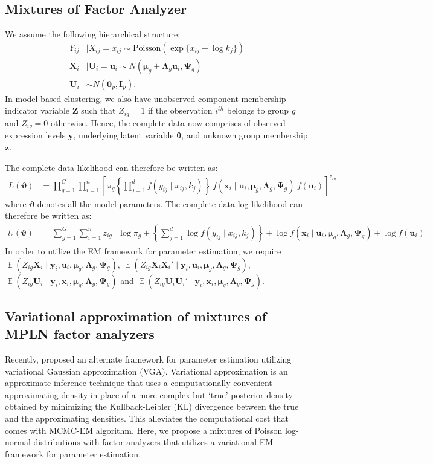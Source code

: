 \documentclass[12pt]{article}
\newcommand{\bI}{\mathbf{I}}
\newcommand{\bU}{\mathbf{U}}
\newcommand{\bX}{\mathbf{X}}
\newcommand{\bu}{\mathbf{u}}
\newcommand{\bx}{\mathbf{x}}
\newcommand{\by}{\mathbf{y}}
\newcommand{\btheta}{\boldsymbol{\theta}}
\newcommand{\bmu}{\boldsymbol{\mu}}
\newcommand{\bLambda}{\boldsymbol{\Lambda}}
\newcommand{\bPsi}{\boldsymbol{\Psi}}
\DeclareMathOperator{\Ev}{\mathbb{E}}
\begin{document}
 \subsection{Mixtures of Factor Analyzer}
We assume the following hierarchical structure:
\begin{align*}
Y_{ij}&\mid X_{ij}=x_{ij}\sim \text{Poisson}\left(\exp\{x_{ij}+\log{k_j}\}\right)\\
\bX_i&\mid \bU_i=\bu_i \sim N(\bmu_g+\bLambda_g \bu_i,\bPsi_g)\\
\bU_i &\sim N(\mathbf{0}_p,\bI_p).
\end{align*}
In model-based clustering, we also have unobserved component membership indicator variable $\mathbf{Z}$ such that $Z_{ig}=1$ if the observation $i^{th}$ belongs to group $g$ and $Z_{ig}=0$ otherwise. 
Hence, the complete data now comprises of observed expression levels $\by$, underlying latent variable $\btheta$, and unknown group membership $\mathbf{z}$. 

The complete data likelihood can therefore be written as:
\begin{align*}
L(\boldsymbol{\vartheta}) &= \prod_{g=1}^G\prod_{i=1}^n\left[\pi_g \left\{\prod_{j=1}^d f(y_{ij}\mid x_{ij},k_j)\right\}~f(\bx_i\mid \bu_i,\bmu_g,\bLambda_g,\bPsi_g)~ f(\bu_i)\right]^{z_{ig}}
\end{align*}
where $\boldsymbol{\vartheta}$ denotes all the model parameters. The complete data log-likelihood can therefore be written as:
\begin{align*}
l_c(\boldsymbol{\vartheta}) &= \sum_{g=1}^G\sum_{i=1}^n z_{ig} \left[\log \pi_g + \left\{\sum_{j=1}^d \log f(y_{ij}\mid x_{ij},k_j)\right\}+ \log f(\bx_i\mid \bu_i,\bmu_g,\bLambda_g,\bPsi_g) + \log f(\bu_i)\right]
\end{align*}
In order to utilize the EM framework for parameter estimation, we require 
$\Ev(Z_{ig}\bX_i\mid \by_i,\bu_i, \bmu_g,\bLambda_g,\bPsi_g)$, $\Ev(Z_{ig}\bX_i\bX_i'\mid\by_i,\bu_i, \bmu_g,\bLambda_g,\bPsi_g)$, $\Ev(Z_{ig}\bU_i\mid \by_i,\bx_i, \bmu_g,\bLambda_g,\bPsi_g)$ and $\Ev(Z_{ig}\bU_i\bU_i'\mid\by_i,\bx_i, \bmu_g,\bLambda_g,\bPsi_g)$. 

\subsection{Variational approximation of mixtures of MPLN factor analyzers}\label{sec:method3}

Recently, \cite{subedi2020parsimonious} proposed an alternate framework for parameter estimation utilizing variational Gaussian approximation (VGA). Variational  approximation \citep{wainwright2008} is an approximate inference technique that uses a computationally convenient approximating density in place of a more complex but `true' posterior density obtained by minimizing the Kullback-Leibler (KL) divergence between the true and the approximating densities. This alleviates the computational cost that comes with MCMC-EM algorithm.
Here, we propose a mixtures of Poisson log-normal distributions with factor analyzers that utilizes a variational EM framework for parameter estimation.
\end{document}
